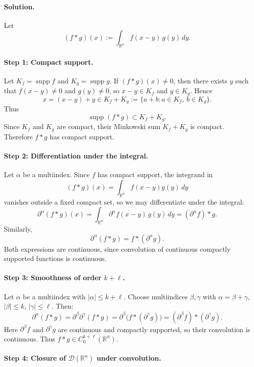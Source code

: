 \documentclass[12pt,a4paper]{article}
\theoremstyle{plain}
\theoremstyle{definition}
\theoremstyle{remark}
\theoremstyle{remark}
\begin{document}
\paragraph{Solution.}

Let
\[
(f*g)(x) := \int_{\mathbb{R}^n} f(x-y)\,g(y)\,dy.
\]

\paragraph*{Step 1: Compact support.}

Let $K_f=\operatorname{supp} f$ and $K_g=\operatorname{supp} g$.
If $(f*g)(x)\neq 0$, then there exists $y$ such that  
$f(x-y)\neq 0$ and $g(y)\neq 0$, so $x-y\in K_f$ and $y\in K_g$.  
Hence
\[
x=(x-y)+y\in K_f+K_g:=\{a+b:a\in K_f,\ b\in K_g\}.
\]
Thus
\[
\operatorname{supp}(f*g)\subset K_f+K_g.
\]
Since $K_f$ and $K_g$ are compact, their Minkowski sum $K_f+K_g$ is
compact. Therefore $f*g$ has compact support.

\paragraph*{Step 2: Differentiation under the integral.}

Let $\alpha$ be a multiindex.  
Since $f$ has compact support, the integrand in
\[
(f*g)(x)=\int_{\mathbb{R}^n}f(x-y)g(y)\,dy
\]
vanishes outside a fixed compact set, so we may differentiate under the
integral:
\[
\partial^\alpha(f*g)(x)
= \int_{\mathbb{R}^n} \partial^\alpha f(x-y)\,g(y)\,dy
= (\partial^\alpha f)*g.
\]
Similarly,
\[
\partial^\alpha(f*g)
= f*(\partial^\alpha g).
\]
Both expressions are continuous, since convolution of continuous compactly
supported functions is continuous.

\paragraph*{Step 3: Smoothness of order $k+\ell$.}

Let $\alpha$ be a multiindex with $|\alpha|\le k+\ell$.  
Choose multiindices $\beta,\gamma$ with  
$\alpha=\beta+\gamma$, $|\beta|\le k$, $|\gamma|\le \ell$. Then:
\[
\partial^\alpha(f*g)
= \partial^\beta\partial^\gamma(f*g)
= \partial^\beta\bigl(f*(\partial^\gamma g)\bigr)
= (\partial^\beta f)*(\partial^\gamma g).
\]
Here $\partial^\beta f$ and $\partial^\gamma g$ are continuous and compactly
supported, so their convolution is continuous.  
Thus $f*g\in C_0^{k+\ell}(\mathbb{R}^n)$.

\paragraph*{Step 4: Closure of $\mathcal{D}(\mathbb{R}^n)$ under convolution.}
\end{document}
